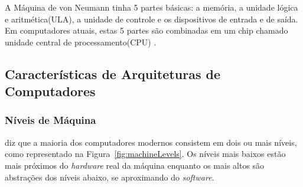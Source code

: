 \documentclass[
	12pt,				%
	openright,			%
	oneside,			%
	a4paper,			%
	english,			%
	french,				%
	spanish,			%
	brazil,				%
	]{abntex2}
\begin{document}
A Máquina de von Neumann tinha 5 partes básicas: a memória, a unidade lógica e aritmética(ULA), a unidade de controle e os dispositivos de entrada e de saída. Em computadores atuais, estas 5 partes são combinadas em um chip chamado unidade central de processamento(CPU) \cite[p.18]{tanenbaum_structured_2013}.

\subsection{Características de Arquiteturas de Computadores}
\subsubsection{Níveis de Máquina}\label{sec:niveis_maquina}
 diz que a maioria dos computadores modernos consistem em dois ou mais níveis, como representado na Figura~\ref{fig:machineLevels}. Os níveis mais baixos estão mais próximos do \textit{hardware} real da máquina enquanto os mais altos são abstrações dos níveis abaixo, se aproximando do \textit{software}.
\end{document}
